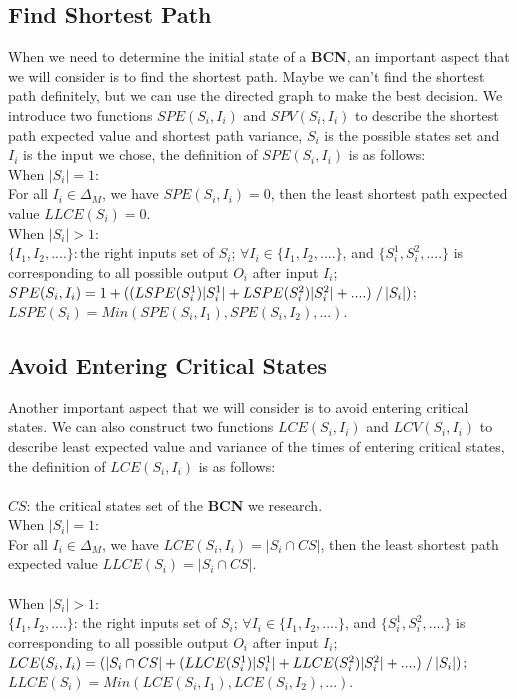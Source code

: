 \documentclass[letterpaper, 10 pt, conference]{ieeeconf}  %
\begin{document}
\subsection{Find Shortest Path}
When we need to determine the initial state of a {\bf BCN}, an important aspect that we will consider is to find the shortest path. Maybe we can't find the shortest path definitely, but we can use the directed graph to make the best decision. We introduce two functions $SPE(S_i, I_i)$ and $SPV(S_i, I_i)$ to describe the shortest path expected value and shortest path variance, $S_i$ is the possible states set and $I_i$ is the input we chose, the definition of $SPE(S_i, I_i)$ is as follows:\\
When $|S_i|=1$:\\ 
For all $I_i \in \Delta_M$, we have $SPE(S_i, I_i)=0$, then the least shortest path  expected value $LLCE(S_i)= 0$. \\
When $|S_i|>1$:\\ 
$\{I_1,I_2,....\}$:\,the right inputs set of $S_i$; $\forall I_i \in \{I_1,I_2,....\}$, and $\{S_i^1,S_i^2,....\}$ is corresponding to all possible output $O_i$ after input $I_i$; $SPE(S_i, I_i)=1 +( (LSPE(S_i^1)|S_i^1|+LSPE(S_i^2)|S_i^2|+....)\left. \right/ |S_i|)$; $LSPE(S_i)= Min(SPE(S_i, I_1),SPE(S_i, I_2),...)$.
\subsection{Avoid Entering Critical States}
Another important aspect that we will consider is to avoid entering critical states. We can also construct two functions $LCE(S_i, I_i)$ and $LCV(S_i, I_i)$ to describe least expected value and variance of the times of entering critical states, the definition of $LCE(S_i, I_i)$ is as follows:\\
\\$CS$: the critical states set of the {\bf BCN} we research.\\
When $|S_i|=1$:\\ 
For all $I_i \in \Delta_M$, we have $LCE(S_i, I_i)=|S_i \cap CS |$, then the least shortest path  expected value $LLCE(S_i)=|S_i \cap CS |$. \\
\\
When $|S_i|>1$:\\ 
$\{I_1,I_2,....\}$: the right inputs set of $S_i$; $\forall I_i \in \{I_1,I_2,....\}$, and $\{S_i^1,S_i^2,....\}$ is corresponding to all possible output $O_i$ after input $I_i$; $LCE(S_i, I_i)=(|S_i \cap CS | + (LLCE(S_i^1)|S_i^1|+LLCE(S_i^2)|S_i^2|+....)\left. \right/ |S_i|)$; $LLCE(S_i)= Min(LCE(S_i, I_1),LCE(S_i, I_2),...)$.
\end{document}
